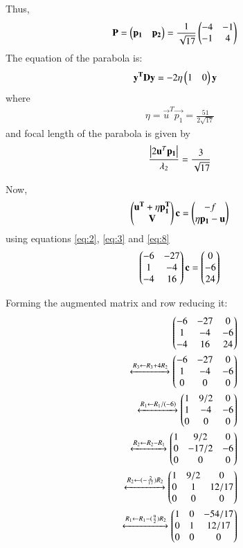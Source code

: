 \documentclass[journal,12pt,twocolumn]{IEEEtran}
\begin{document}
Thus,
\begin{align}
		\mathbf{P}&=\begin{pmatrix}\mathbf{p_1}&\mathbf{p_2}\end{pmatrix}=\frac{1}{\sqrt{17}} \begin{pmatrix}-4 & -1\\ -1 & 4\end{pmatrix} 
\end{align}
The equation of the parabola is:
\begin{align}
		\mathbf{y^T}\mathbf{D}\mathbf{y}&=-2\eta\begin{pmatrix}1&0\end{pmatrix}\mathbf{y}
\end{align}
where
\begin{align}
		\eta=\vec{u}^T\vec{p_1}=\frac{51}{2\sqrt{17}}
\end{align}
and focal length of the parabola is given by 
\begin{align}
	\frac{\left\vert2\mathbf{u}^T\mathbf{p_1}\right\vert}{\lambda_2}	= \frac{3}{\sqrt{17}}
\end{align}

Now,
\begin{align}
		\begin{pmatrix}\mathbf{u^T}+\eta\mathbf{p_1^T} \\ \mathbf{V}\end{pmatrix}\mathbf{c}=
		\begin{pmatrix}-f \\ \eta\mathbf{p_1}-\mathbf{u}\end{pmatrix} \label{eq:8}
\end{align}
using equations \eqref{eq:2}, \eqref{eq:3} and \eqref{eq:8}
\begin{align}
	\begin{pmatrix}-6& -27 \\ 1 & -4 \\  -4 & 16 \end{pmatrix}\mathbf{c}=\begin{pmatrix}0 \\ -6\\ 24\end{pmatrix} 
\end{align}

Forming the augmented matrix and row reducing it:
\begin{align}
		\begin{pmatrix}-6 & -27 & 0\\1 & -4 & -6 \\-4 & 16 & 24\end{pmatrix}\\
		\xleftrightarrow[]{R_3\leftarrow R_3+ 4R_2} 
		\begin{pmatrix}-6 & -27 & 0\\1 & -4 & -6 \\0 & 0 &0 \end{pmatrix}\\
		\xleftrightarrow[]{R_1\leftarrow R_1/(-6)} 
		\begin{pmatrix}1 & 9/2 & 0\\1 & -4 & -6\\0 & 0 &0 \end{pmatrix}\\
		\xleftrightarrow[]{R_2\leftarrow R_2-R_1} 
		\begin{pmatrix}1 & 9/2 & 0\\0 & -17/2 & -6 \\0 & 0 &0 \end{pmatrix}\\
		\xleftrightarrow[]{R_2\leftarrow (-\frac{2}{17})R_2}
		\begin{pmatrix}1 & 9/2 & 0\\0 & 1 & 12/17\\0 & 0 &0\end{pmatrix}\\ 
		\xleftrightarrow[]{R_1\leftarrow R_1 -(\frac{9}{2})R_2}
		\begin{pmatrix}1 & 0 & -54/17\\0 & 1 & 12/17 \\0 & 0 &0\end{pmatrix}
\end{align}
\end{document}
